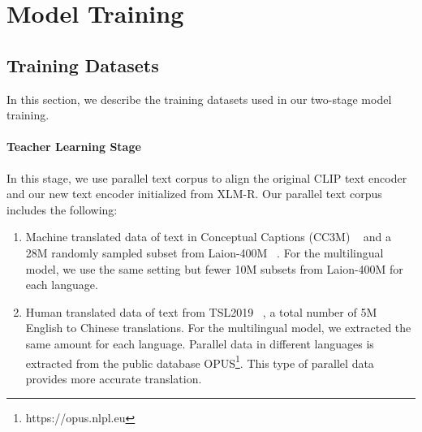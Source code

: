 \section{Model Training}
\subsection{Training Datasets} \label{training data}
In this section, we describe the training datasets used in our two-stage model training. 

\paragraph{Teacher Learning Stage}
In this stage, we use parallel text corpus to align the original CLIP text encoder and our new text encoder initialized from XLM-R. Our parallel text corpus includes the following:
\begin{enumerate}

\item Machine translated data of text in Conceptual Captions (CC3M) ~\cite{sharma2018conceptual} and a 28M randomly sampled subset from Laion-400M ~\cite{schuhmann2021laion}. For the multilingual model, we use the same setting but fewer 10M subsets from Laion-400M for each language.
\item Human translated data of text from TSL2019 ~\cite{xu2019nlp}, a total number of 5M English to Chinese translations. For the multilingual model, we extracted the same amount for each language. Parallel data in different languages is extracted from the public database OPUS\cite{tiedemann2012parallel}\footnote{https://opus.nlpl.eu}. This type of parallel data provides more accurate translation.

\end{enumerate}


